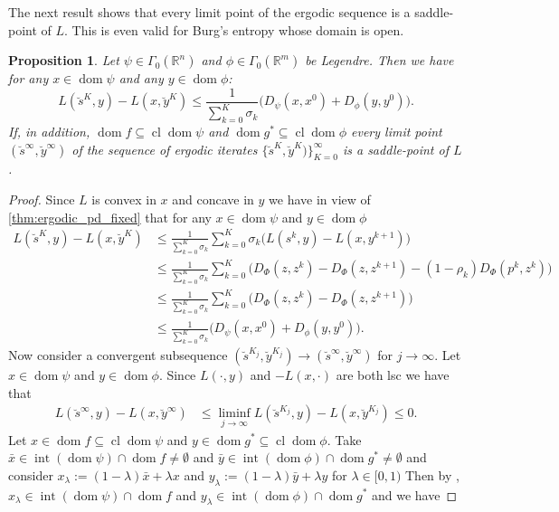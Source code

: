 \documentclass[11pt,onecolumn]{article}
\DeclareMathOperator{\dom}{dom}
\DeclareMathOperator{\intr}{int}
\DeclareMathOperator{\cl}{cl}
\newcommand{\bR}{\mathbb{R}}
\newtheorem{proposition}[proposition]{Proposition}
\theoremstyle{remark}
\begin{document}
The next result shows that every limit point of the ergodic sequence is a saddle-point of $L$. This is even valid for Burg's entropy whose domain is open.
\begin{proposition} \label{thm:ergodic_pd}
Let $\psi \in \Gamma_0(\bR^n)$ and $\phi \in \Gamma_0(\bR^m)$ be Legendre. Then we have for any $x \in \dom \psi$ and any $y \in \dom \phi$:
$$
L(\breve s^K, y) - L(x, \breve y^K) \leq \frac{1}{\sum_{k=0}^{K} \sigma_k} \big(D_\psi(x, x^0) + D_\phi(y, y^0)\big).
$$
If, in addition, $\dom f \subseteq \cl \dom \psi$ and $\dom g^* \subseteq \cl \dom \phi$ every limit point $(\breve s^\infty, \breve y^\infty)$ of the sequence of ergodic iterates $\{\breve s^K, \breve y^K)\}_{K=0}^\infty$ is a saddle-point of $L$.
\end{proposition}
\begin{proof}
Since $L$ is convex in $x$ and concave in $y$ we have in view of \cref{thm:ergodic_pd_fixed} that for any $x \in \dom \psi$ and $y \in \dom \phi$
\begin{align*}
L(\breve s^K, y) - L(x, \breve y^K) &\leq \frac{1}{\sum_{k=0}^{K} \sigma_k} \sum_{k=0}^{K} \sigma_k \big( L(s^{k}, y) - L(x, y^{k+1}) \big) \\
&\leq \frac{1}{\sum_{k=0}^{K} \sigma_k} \sum_{k=0}^{K} \big(D_\Phi(z,z^k) -  D_\Phi(z,z^{k+1}) - (1-\rho_k) D_\Phi(p^k,z^{k})\big) \\
&\leq \frac{1}{\sum_{k=0}^{K} \sigma_k} \sum_{k=0}^{K} \big(D_\Phi(z,z^k) -  D_\Phi(z,z^{k+1}) \big) \\
&\leq \frac{1}{\sum_{k=0}^{K} \sigma_k} \big(D_\psi(x, x^0)+ D_\phi(y, y^{0}) \big).
\end{align*}
Now consider a convergent subsequence $(\breve s^{K_j}, \breve y^{K_j}) \to (\breve s^\infty, \breve y^\infty)$ for $j \to \infty$.
Let $x \in \dom \psi$ and $y \in \dom \phi$.
Since $L(\cdot, y)$ and $-L(x, \cdot)$ are both lsc we have that
\begin{align*}
L(\breve s^\infty, y) - L(x, \breve y^\infty) &\leq \liminf_{j \to \infty} L(\breve s^{K_j}, y) - L(x, \breve y^{K_j}) \leq 0.
\end{align*}
Let $x \in \dom f \subseteq \cl \dom \psi$ and $y \in \dom g^*\subseteq \cl \dom \phi$. Take $\bar x \in \intr (\dom \psi) \cap \dom f \neq \emptyset$ and $\bar y \in \intr (\dom \phi) \cap \dom g^* \neq \emptyset$ and consider $x_\lambda:=(1-\lambda) \bar x + \lambda x$ and $y_\lambda:=(1-\lambda) \bar y + \lambda y$ for $\lambda \in [0, 1)$
Then by \cite[Theorem 6.1]{Roc70}, $x_\lambda \in \intr( \dom \psi ) \cap \dom f$ and $y_\lambda \in \intr( \dom \phi ) \cap \dom g^*$ and we have

\end{proof}
\end{document}
